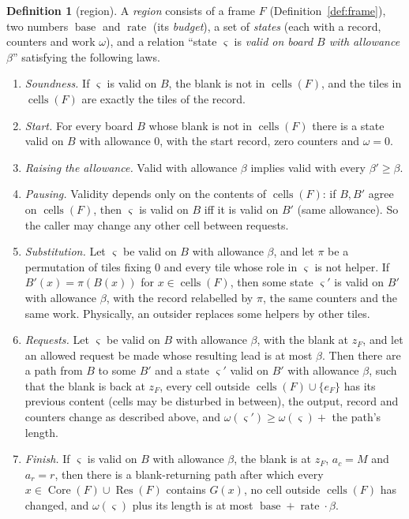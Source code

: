 \documentclass[11pt]{amsart}
\theoremstyle{definition}
\newtheorem{definition}[theorem]{Definition}
\newcommand{\cells}{\operatorname{cells}}
\newcommand{\Core}{\operatorname{Core}}
\newcommand{\Res}{\operatorname{Res}}
\newcommand{\base}{\operatorname{base}}
\newcommand{\rate}{\operatorname{rate}}
\begin{document}
\begin{definition}[region]\label{def:region}
A \emph{region} consists of a frame $F$ (Definition~\ref{def:frame}), two numbers $\base$ and $\rate$ (its \emph{budget}), a set of
\emph{states} (each with a record, counters and work $\omega$), and a relation ``state $\varsigma$ is \emph{valid on board $B$
with allowance $\beta$}'' satisfying the following laws.
\begin{enumerate}[label=(R\arabic*),nosep]
\item\label{R:sound} \emph{Soundness.} If $\varsigma$ is valid on $B$, the blank is not in $\cells(F)$, and the tiles in
  $\cells(F)$ are exactly the tiles of the record.
\item\label{R:start} \emph{Start.} For every board $B$ whose blank is not in $\cells(F)$ there is a state valid on $B$ with
  allowance $0$, with the start record, zero counters and $\omega=0$.
\item\label{R:relax} \emph{Raising the allowance.} Valid with allowance $\beta$ implies valid with every $\beta'\ge\beta$.
\item\label{R:pause} \emph{Pausing.} Validity depends only on the contents of $\cells(F)$: if $B,B'$ agree on $\cells(F)$, then
  $\varsigma$ is valid on $B$ iff it is valid on $B'$ (same allowance). So the caller may change any other cell between requests.
\item\label{R:subst} \emph{Substitution.} Let $\varsigma$ be valid on $B$ with allowance $\beta$, and let $\pi$ be a permutation of tiles fixing
  $0$ and every tile whose role in $\varsigma$ is not helper. If $B'(x)=\pi(B(x))$ for $x\in\cells(F)$, then some state $\varsigma'$ is
  valid on $B'$ with allowance $\beta$, with the record relabelled by $\pi$, the same counters and the same work.
  Physically, an outsider replaces some helpers by other tiles.
\item\label{R:request} \emph{Requests.} Let $\varsigma$ be valid on $B$ with allowance $\beta$, with the blank at $z_F$, and let an allowed
  request be made whose resulting lead is at most $\beta$. Then there are a path from $B$ to some $B'$ and a state $\varsigma'$ valid on $B'$ with
  allowance $\beta$, such that the blank is back at $z_F$, every cell outside $\cells(F)\cup\{e_F\}$ has its previous content (cells may be
  disturbed in between), the output, record and counters change as described above, and $\omega(\varsigma')\ge\omega(\varsigma)+$ the path's length.
\item\label{R:finish} \emph{Finish.} If $\varsigma$ is valid on $B$ with allowance $\beta$, the blank is at $z_F$, $a_c=M$ and $a_r=r$, then there is a
  blank-returning path after which every $x\in\Core(F)\cup\Res(F)$ contains $G(x)$, no cell outside $\cells(F)$ has changed, and
  $\omega(\varsigma)$ plus its length is at most $\base+\rate\cdot\beta$.
\end{enumerate}
\end{definition}
\end{document}

